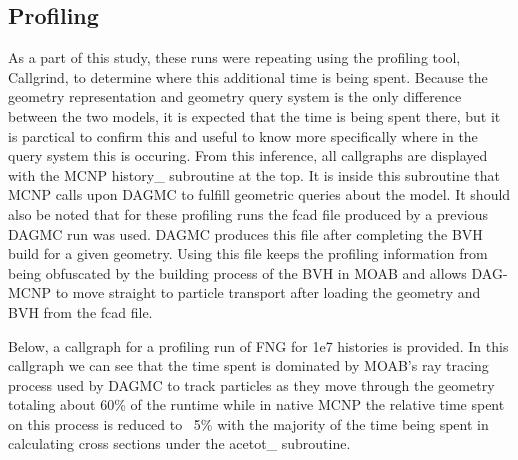\documentclass[10pt, a4paper]{article}
\begin{document}
\subsection{Profiling}%

As a part of this study, these runs were repeating using the profiling tool, Callgrind, to determine where this additional time is being spent. Because the geometry representation and geometry query system is the only difference between the two models, it is expected that the time is being spent there, but it is parctical to confirm this and useful to know more specifically where in the query system this is occuring. From this inference, all callgraphs are displayed with the MCNP history\_ subroutine at the top. It is inside this subroutine that MCNP calls upon DAGMC to fulfill geometric queries about the model. It should also be noted that for these profiling runs the fcad file produced by a previous DAGMC run was used. DAGMC produces this file after completing the BVH build for a given geometry. Using this file keeps the profiling information from being obfuscated by the building process of the BVH in MOAB and allows DAG-MCNP to move straight to particle transport after loading the geometry and BVH from the fcad file. 

Below, a callgraph for a profiling run of FNG for 1e7 histories is provided. In this callgraph we can see that the time spent is dominated by MOAB's ray tracing process used by DAGMC to track particles as they move through the geometry totaling about 60\% of the runtime while in native MCNP the relative time spent on this process is reduced to ~5\% with the majority of the time being spent in calculating cross sections under the acetot\_ subroutine. 
\end{document}
